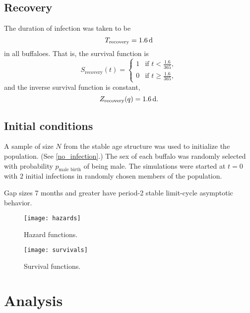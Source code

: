 \documentclass{jpmarticle}
\begin{document}
\subsection{Recovery}

The duration of infection was taken to be
\begin{equation}
  T_{\text{recovery}} = \unit[1.6]{d}
\end{equation}
in all buffaloes.  That is, the survival function is
\begin{equation}
  S_{\text{recovery}}(t) =
  \begin{cases}
    1 & \text{if $t < \frac{1.6}{365}$},
    \\
    0 & \text{if $t \geq \frac{1.6}{365}$},
  \end{cases}
\end{equation}
and the inverse survival function is constant,
\begin{equation}
  Z_{\text{recovery}}(q) = \unit[1.6]{d}.
\end{equation}


\subsection{Initial conditions}

A sample of size $N$ from the stable age structure was used to
initialize the population.  (See \autoref{no_infection}.)  The sex of
each buffalo was randomly selected with probability
$p_{\text{male birth}}$ of being male.  The simulations were started
at $t = 0$ with $2$ initial infections in randomly chosen members of
the population.

Gap sizes 7 months and greater have period-2 stable limit-cycle
asymptotic behavior.


\begin{figure}
  \centering
  \texttt{[image: hazards]}
  \caption{Hazard functions.}
  \label{fig:hazard}
\end{figure}


\begin{figure}
  \centering
  \texttt{[image: survivals]}
  \caption{Survival functions.}
  \label{fig:survival}
\end{figure}



\clearpage
\section{Analysis}
\end{document}
